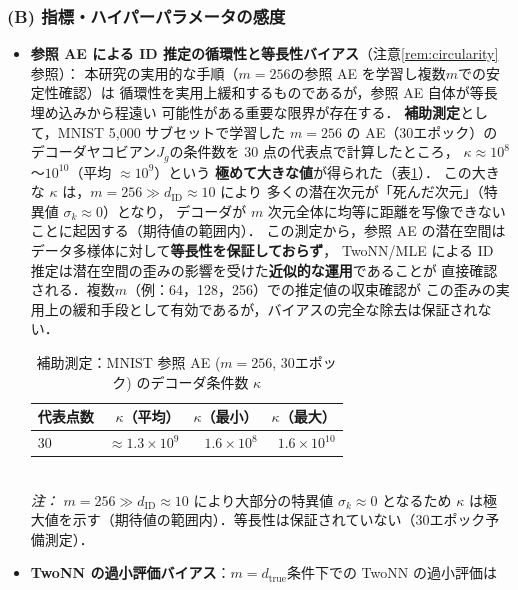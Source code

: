 \documentclass[12pt,a4paper]{jsarticle}
\newcommand{\dID}{d_{\mathrm{ID}}}
\newcommand{\dtrue}{d_{\mathrm{true}}}
\newcommand{\Jg}{J_g}
\newcommand{\kap}{\kappa}
\begin{document}
\subsubsection*{(B) 指標・ハイパーパラメータの感度}

\begin{itemize}
  \item \textbf{参照 AE による ID 推定の循環性と等長性バイアス}（注意\ref{rem:circularity}参照）：
        本研究の実用的な手順（$m = 256$の参照 AE を学習し複数$m$での安定性確認）は
        循環性を実用上緩和するものであるが，参照 AE 自体が等長埋め込みから程遠い
        可能性がある重要な限界が存在する．
        \textbf{補助測定}として，MNIST 5,000 サブセットで学習した $m = 256$ の AE（30エポック）の
        デコーダヤコビアン$\Jg$の条件数を 30 点の代表点で計算したところ，
        $\kap \approx 10^{8}$〜$10^{10}$（平均 $\approx 10^{9}$）という
        \textbf{極めて大きな値}が得られた（表\ref{tab:ref_ae_kappa}）．
        この大きな $\kap$ は，$m = 256 \gg \dID \approx 10$ により
        多くの潜在次元が「死んだ次元」（特異値 $\sigma_k \approx 0$）となり，
        デコーダが $m$ 次元全体に均等に距離を写像できないことに起因する（期待値の範囲内）．
        この測定から，参照 AE の潜在空間はデータ多様体に対して\textbf{等長性を保証しておらず}，
        TwoNN/MLE による ID 推定は潜在空間の歪みの影響を受けた\textbf{近似的な運用}であることが
        直接確認される．複数$m$（例：64，128，256）での推定値の収束確認が
        この歪みの実用上の緩和手段として有効であるが，バイアスの完全な除去は保証されない．
        \begin{table}[H]
        \centering
        \caption{補助測定：MNIST 参照 AE ($m=256$, 30エポック) のデコーダ条件数 $\kap$}
        \label{tab:ref_ae_kappa}
        \small
        \begin{tabular}{lrrr}
        \toprule
        代表点数 & $\kap$（平均） & $\kap$（最小） & $\kap$（最大） \\
        \midrule
        30 & $\approx 1.3 \times 10^9$ & $1.6 \times 10^8$ & $1.6 \times 10^{10}$ \\
        \bottomrule
        \end{tabular}
        \vspace{0.5em}
        \\\footnotesize
        \textit{注：} $m = 256 \gg \dID \approx 10$ により大部分の特異値 $\sigma_k \approx 0$ となるため
        $\kap$ は極大値を示す（期待値の範囲内）．等長性は保証されていない（30エポック予備測定）．
        \end{table}
  \item \textbf{TwoNN の過小評価バイアス}：$m = \dtrue$条件下での TwoNN の過小評価は

\end{itemize}
\end{document}
